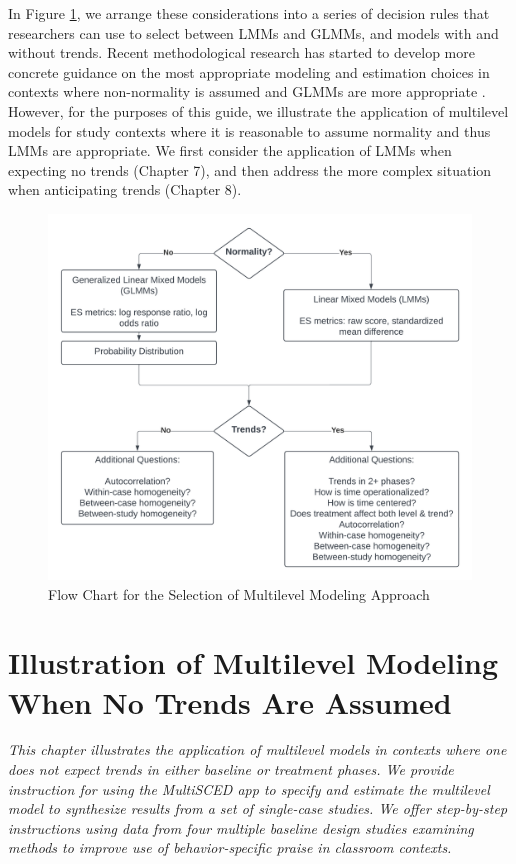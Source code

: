 \documentclass[
]{book}
\begin{document}
In Figure \ref{fig:mlmapproach}, we arrange these considerations into a series of decision rules that researchers can use to select between LMMs and GLMMs, and models with and without trends.
Recent methodological research has started to develop more concrete guidance on the most appropriate modeling and estimation choices in contexts where non-normality is assumed and GLMMs are more appropriate \citep{Li_Luo_Baek_Thompson_Lam_2023}.
However, for the purposes of this guide, we illustrate the application of multilevel models for study contexts where it is reasonable to assume normality and thus LMMs are appropriate.
We first consider the application of LMMs when expecting no trends (Chapter 7), and then address the more complex situation when anticipating trends (Chapter 8).

\begin{figure}
\includegraphics[width=0.75\linewidth]{images/flowchart_MLMApproach} \caption{Flow Chart for the Selection of Multilevel Modeling Approach}\label{fig:mlmapproach}
\end{figure}

\hypertarget{MLM-NoTrend}{%
\chapter{Illustration of Multilevel Modeling When No Trends Are Assumed}\label{MLM-NoTrend}}


\emph{This chapter illustrates the application of multilevel models in contexts where one does not expect trends in either baseline or treatment phases. We provide instruction for using the MultiSCED app to specify and estimate the multilevel model to synthesize results from a set of single-case studies. We offer step-by-step instructions using data from four multiple baseline design studies examining methods to improve use of behavior-specific praise in classroom contexts.}
\end{document}
